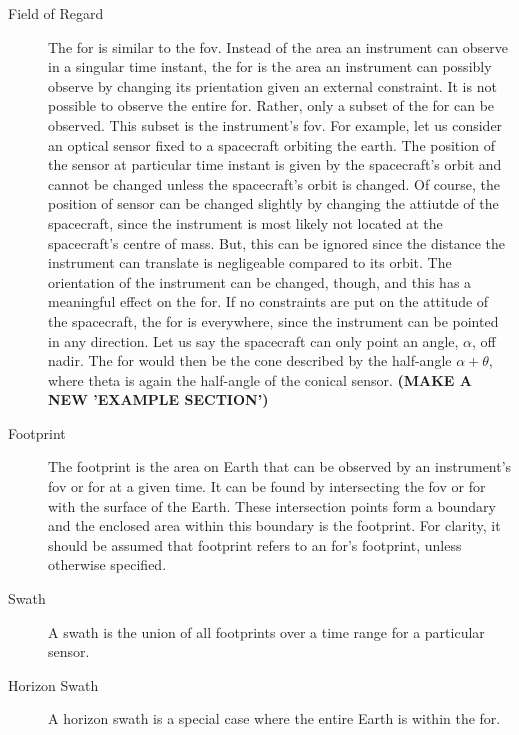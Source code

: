 \begin{description}
    \item[Field of Regard] The \gls{for} is similar to the \gls{fov}. Instead
	of the area an instrument can observe in a singular time instant, the
	\gls{for} is the area an instrument can possibly observe by changing
	its prientation given an external constraint. It is not possible to
	observe the entire \gls{for}. Rather, only a subset of the \gls{for}
	can be observed. This subset is the instrument's \gls{fov}. For
	example, let us consider an optical sensor fixed to a spacecraft
	orbiting the earth. The position of the sensor at particular time
	instant is given by the spacecraft's orbit and cannot be changed unless
	the spacecraft's orbit is changed. Of course, the position of sensor
	can be changed slightly by changing the attiutde of the spacecraft,
	since the instrument is most likely not located at the spacecraft's
	centre of mass. But, this can be ignored since the distance the
	instrument can translate is negligeable compared to its orbit. The
	orientation of the instrument can be changed, though, and this has a
	meaningful effect on the \gls{for}. If no constraints are put on the
	attitude of the spacecraft, the \gls{for} is everywhere, since the
	instrument can be pointed in any direction. Let us say the spacecraft
	can only point an angle, $\alpha$, off nadir. The \gls{for} would then
	be the cone described by the half-angle $\alpha + \theta$, where theta
	is again the half-angle of the conical sensor. \textbf{(MAKE A NEW
	'EXAMPLE SECTION')}
 

    \item[Footprint] The footprint is the area on Earth that can be observed by
	an instrument's \gls{fov} or \gls{for} at a given time. It can be found
	by intersecting the \gls{fov} or \gls{for} with the surface of the
	Earth.  These intersection points form a boundary and the enclosed area
	within this boundary is the footprint. For clarity, it should be
	assumed that footprint refers to an \gls{for}'s footprint, unless
	otherwise specified.

    \item[Swath] A swath is the union of all footprints over a time range for a
	particular sensor.


    \item[Horizon Swath] A horizon swath is a special case where the entire
	Earth is within the \gls{for}. 




	
\end{description}



